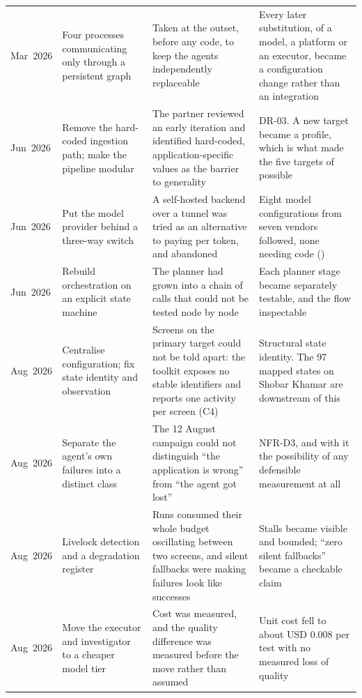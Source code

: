 \begin{xltabular}{\textwidth}{@{}>{\hsize}Y>{\hsize}Y>{\hsize}Y>{\hsize}Y@{}}
  \mbox{Mar 2026} & Four processes communicating only through a persistent graph & Taken at the outset, before any code, to keep the agents independently replaceable & Every later substitution, of a model, a platform or an executor, became a configuration change rather than an integration \\
  \addlinespace
  \mbox{Jun 2026} & Remove the hard-coded ingestion path; make the pipeline modular & The partner reviewed an early iteration and identified hard-coded, application-specific values as the barrier to generality & DR-03. A new target became a profile, which is what made the five targets of  possible \\
  \addlinespace
  \mbox{Jun 2026} & Put the model provider behind a three-way switch & A self-hosted backend over a tunnel was tried as an alternative to paying per token, and abandoned & Eight model configurations from seven vendors followed, none needing code () \\
  \addlinespace
  \mbox{Jun 2026} & Rebuild orchestration on an explicit state machine & The planner had grown into a chain of calls that could not be tested node by node & Each planner stage became separately testable, and the flow inspectable \\
  \addlinespace
  \mbox{Aug 2026} & Centralise configuration; fix state identity and observation & Screens on the primary target could not be told apart: the toolkit exposes no stable identifiers and reports one activity per screen (C4) & Structural state identity. The 97 mapped states on Shobar Khamar are downstream of this \\
  \addlinespace
  \mbox{Aug 2026} & Separate the agent's own failures into a distinct class & The 12 August campaign could not distinguish ``the application is wrong'' from ``the agent got lost'' & NFR-D3, and with it the possibility of any defensible measurement at all \\
  \addlinespace
  \mbox{Aug 2026} & Livelock detection and a degradation register & Runs consumed their whole budget oscillating between two screens, and silent fallbacks were making failures look like successes & Stalls became visible and bounded; ``zero silent fallbacks'' became a checkable claim \\
  \addlinespace
  \mbox{Aug 2026} & Move the executor and investigator to a cheaper model tier & Cost was measured, and the quality difference was measured before the move rather than assumed & Unit cost fell to about USD 0.008 per test with no measured loss of quality \\

\end{xltabular}
